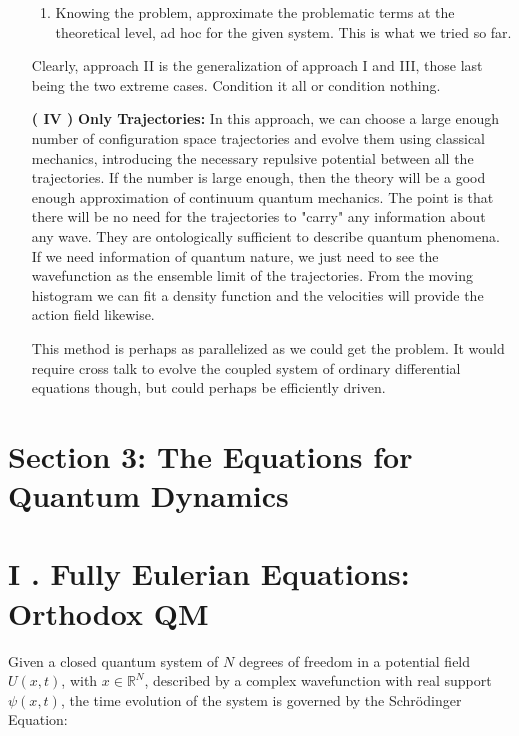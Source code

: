 \documentclass[11pt, a4paper]{article} %
\newcommand{\R}{\mathbb{R}} %
\begin{document}
\begin{enumerate}
\begin{enumerate}
\item Knowing the problem, approximate the problematic terms at the theoretical level, ad hoc for the given system. This is what we tried so far.
\end{enumerate}

Clearly, approach II is the generalization of approach I and III, those last being the two extreme cases. Condition it all or condition nothing.

\item [\bf ( IV )] {\bf Only Trajectories:} In this approach, we can choose a large enough number of configuration space trajectories and evolve them using classical mechanics, introducing the necessary repulsive potential between all the trajectories. If the number is large enough, then the theory will be a good enough approximation of continuum quantum mechanics. The point is that there will be no need for the trajectories to "carry" any information about any wave. They are ontologically sufficient to describe quantum phenomena. If we need information of quantum nature, we just need to see the wavefunction as the ensemble limit of the trajectories. From the moving histogram we can fit a density function and the velocities will provide the action field likewise.

This method is perhaps as parallelized as we could get the problem. It would require cross talk to evolve the coupled system of ordinary differential equations though, but could perhaps be efficiently driven.

\end{enumerate}


\newpage
{}
\section*{Section 3: The Equations for Quantum Dynamics }
\section*{I . Fully Eulerian Equations: Orthodox QM }
Given a closed quantum system of $N$ degrees of freedom in a potential field $U(x, t)$, with $x\in\R^N$, described by a complex wavefunction with real support $\psi(x,t)$, the time evolution of the system is governed by the Schrödinger Equation:
\end{document}
